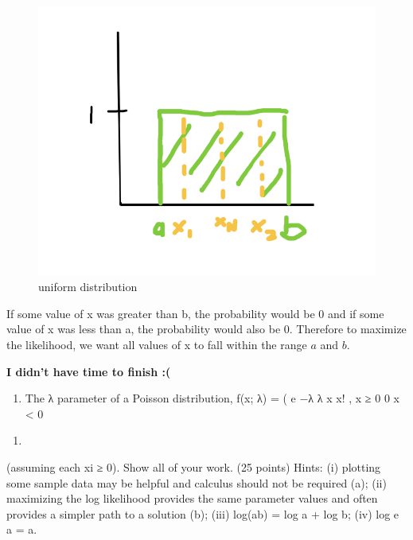 \documentclass[
  letterpaper,
  DIV=11,
  numbers=noendperiod]{scrartcl}
\providecommand{\tightlist}{%
  \setlength{\itemsep}{0pt}\setlength{\parskip}{0pt}}\usepackage{longtable,booktabs,array}
\begin{document}
\begin{figure}

{\centering \includegraphics{./uniformDistribution.png}

}

\caption{uniform distribution}

\end{figure}

If some value of x was greater than b, the probability would be 0 and if
some value of x was less than a, the probability would also be 0.
Therefore to maximize the likelihood, we want all values of x to fall
within the range \(a\) and \(b\).

\newpage{}

\textbf{I didn't have time to finish :(}

\begin{enumerate}
\def\labelenumi{(\alph{enumi})}
\setcounter{enumi}{1}
\tightlist
\item
  The λ parameter of a Poisson distribution, f(x; λ) = ( e −λ λ x x! , x
  ≥ 0 0 x \textless{} 0
\end{enumerate}

\begin{enumerate}
\def\labelenumi{(\arabic{enumi})}
\setcounter{enumi}{1}
\tightlist
\item
\end{enumerate}

(assuming each xi ≥ 0). Show all of your work. (25 points) Hints: (i)
plotting some sample data may be helpful and calculus should not be
required (a); (ii) maximizing the log likelihood provides the same
parameter values and often provides a simpler path to a solution (b);
(iii) log(ab) = log a + log b; (iv) log e a = a.
\end{document}
